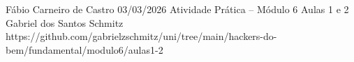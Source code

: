 \documentclass{article}
\begin{document}
{Fábio Carneiro de Castro}
{03/03/2026}
{Atividade Prática -- Módulo 6}
{Aulas 1 e 2}
{Gabriel dos Santos Schmitz}
{https://github.com/gabrielzschmitz/uni/tree/main/hackers-do-bem/fundamental/modulo6/aulas1-2}




\newpage
\printbibliography[title=Referências]
\end{document}

